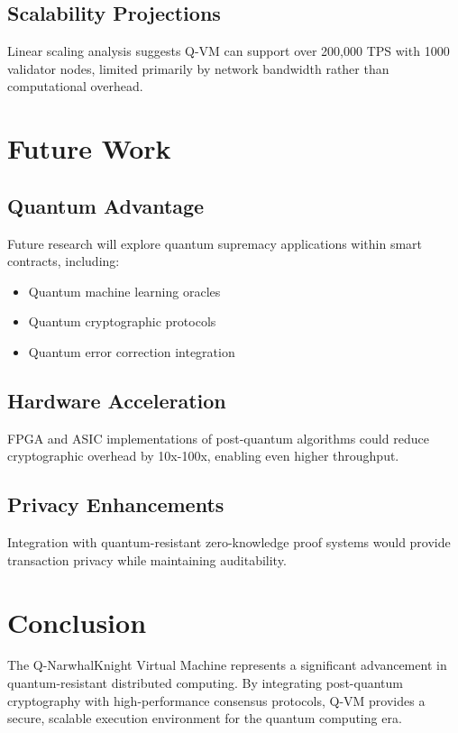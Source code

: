 \documentclass[11pt]{article}
\begin{document}
\subsection{Scalability Projections}

Linear scaling analysis suggests Q-VM can support over 200,000 TPS with 1000 validator nodes, limited primarily by network bandwidth rather than computational overhead.

\section{Future Work}

\subsection{Quantum Advantage}

Future research will explore quantum supremacy applications within smart contracts, including:

\begin{itemize}
    \item Quantum machine learning oracles
    \item Quantum cryptographic protocols
    \item Quantum error correction integration
\end{itemize}

\subsection{Hardware Acceleration}

FPGA and ASIC implementations of post-quantum algorithms could reduce cryptographic overhead by 10x-100x, enabling even higher throughput.

\subsection{Privacy Enhancements}

Integration with quantum-resistant zero-knowledge proof systems would provide transaction privacy while maintaining auditability.

\section{Conclusion}

The Q-NarwhalKnight Virtual Machine represents a significant advancement in quantum-resistant distributed computing. By integrating post-quantum cryptography with high-performance consensus protocols, Q-VM provides a secure, scalable execution environment for the quantum computing era.
\end{document}
